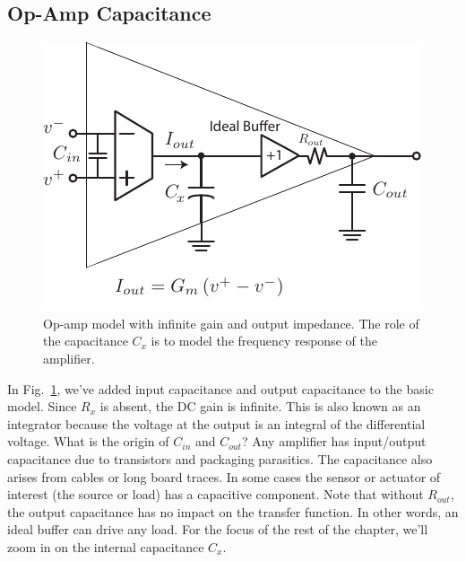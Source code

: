 \subsection{Op-Amp Capacitance}
\begin{figure}[tb]
\centering
\includegraphics[scale=1]{opamp_ota_model_cap}
\caption{Op-amp model with infinite gain and output impedance.  The role of the capacitance $C_x$ is to model the frequency response of the amplifier.}
\label{fig:opamp_ota_model_cap}
\end{figure}
In Fig.~\ref{fig:opamp_ota_model_cap}, we've added input capacitance and output capacitance to the basic model.  Since $R_x$ is absent, the DC gain is infinite.  This is also known as an integrator because the voltage at the output is an integral of the differential voltage.    
What is the origin of $C_{in}$ and $C_{out}$?  Any amplifier has input/output capacitance due to transistors and packaging parasitics.  The capacitance also arises from cables or long board traces.  In some cases the sensor or actuator of interest (the source or load) has a capacitive component. Note that without $R_{out}$, the output capacitance has no impact on the transfer function.  In other words, an ideal buffer can drive any load.  For the focus of the rest of the chapter, we'll zoom in on the internal capacitance $C_x$.
